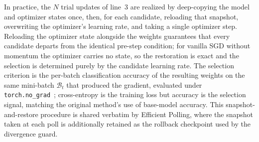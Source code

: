 \documentclass[conference]{IEEEtran}
\begin{document}
In practice, the $N$ trial updates of line~3 are realized by deep-copying the model and optimizer states once, then, for each candidate, reloading that snapshot, overwriting the optimizer's learning rate, and taking a single optimizer step. Reloading the optimizer state alongside the weights guarantees that every candidate departs from the identical pre-step condition; for vanilla SGD without momentum the optimizer carries no state, so the restoration is exact and the selection is determined purely by the candidate learning rate. The selection criterion is the per-batch classification accuracy of the resulting weights on the same mini-batch $\mathcal{B}_t$ that produced the gradient, evaluated under \texttt{torch.no\_grad}~\cite{paszke2019pytorch}; cross-entropy is the training loss but accuracy is the selection signal, matching the original method's use of base-model accuracy. This snapshot-and-restore procedure is shared verbatim by Efficient Polling, where the snapshot taken at each poll is additionally retained as the rollback checkpoint used by the divergence guard.
\end{document}
